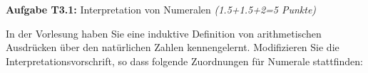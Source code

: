 \RequirePackage{fix-cm}


\newcommand{\obenlinks}{Übungen zur Vorlesung Informatik I}   %




\graphicspath{ {./images/} }
\textbf{Aufgabe T3.1:} Interpretation von Numeralen \textit{(1.5+1.5+2=5 Punkte)}

In der Vorlesung haben Sie eine induktive Definition von arithmetischen Ausdrücken über den natürlichen Zahlen kennengelernt. Modifizieren Sie die Interpretationsvorschrift, so dass folgende Zuordnungen für Numerale stattfinden:

